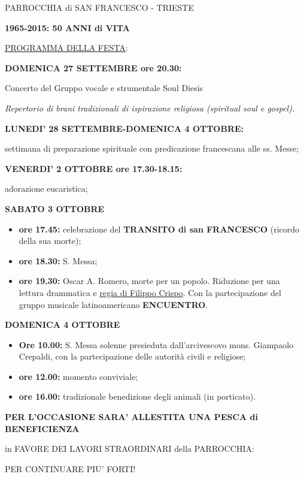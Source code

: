 \documentclass[17pt,titlepage,extrafontsizes]{memoir}
\begin{document}
\pagestyle{empty}
\begin{center}
{\LARGE PARROCCHIA di SAN FRANCESCO - TRIESTE\par
\vspace{1cm}
\textbf{1965-2015: 50 ANNI di VITA}}
\end{center}
\vfill
{\Large \ul{PROGRAMMA DELLA FESTA}:}
\par\bigskip\bigskip
\textbf{\Large DOMENICA 27 SETTEMBRE ore 20.30:}
\par\medskip
{\large Concerto del  Gruppo vocale e strumentale Soul Diesis\par}
\textit{Repertorio di brani tradizionali di ispirazione religiosa (spiritual soul e gospel).}
\par\bigskip\bigskip
\textbf{\Large LUNEDI’ 28 SETTEMBRE-DOMENICA 4 OTTOBRE:}
\par\medskip
{\large settimana di preparazione spirituale con predicazione francescana alle ss. Messe;}
\par\bigskip\bigskip
\textbf{\Large VENERDI’ 2 OTTOBRE ore 17.30-18.15:}
\par\medskip
{\large adorazione eucaristica;}
\par\bigskip\bigskip
\textbf{\Large SABATO 3 OTTOBRE}
\par\medskip
\begin{itemize}
 \large
 \item \textbf{ore 17.45:} celebrazione del \textbf{TRANSITO di san FRANCESCO} (ricordo della sua morte);
 \item \textbf{ore 18.30:} S. Messa;
 \item \textbf{ore 19.30:} Oscar A. Romero, morte per un popolo. Riduzione per una lettura drammatica e \ul{regia di Filippo Crispo}. Con la partecipazione del gruppo musicale latinoamericano \textbf{ENCUENTRO}.
\end{itemize}
\par\bigskip\bigskip
\textbf{\Large DOMENICA 4 OTTOBRE}
\par\medskip
\begin{itemize}
 \large
 \item \textbf{Ore 10.00:} S. Messa solenne presieduta dall’arcivescovo mons. Giampaolo Crepaldi, con la partecipazione delle autorità civili e religiose;
 \item \textbf{ore 12.00:} momento conviviale;
 \item \textbf{ore 16.00:} tradizionale benedizione degli animali (in porticato).
\end{itemize}
\vfill
\begin{center}
\large\bfseries 
PER L’OCCASIONE SARA’ ALLESTITA UNA PESCA di BENEFICIENZA\par
in FAVORE DEI LAVORI STRAORDINARI della PARROCCHIA:\par
\Large PER CONTINUARE PIU’ FORTI!
\end{center}
\vfill
\newpage
\end{document}
